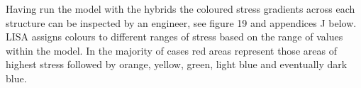 \noindent
Having run the model with the hybrids the coloured stress gradients across each structure can be inspected by an engineer, see figure 19 and appendices J below. LISA assigns colours to different ranges of stress based on the range of values within the model. In the majority of cases red areas represent those areas of highest stress followed by orange, yellow, green, light blue and eventually dark blue.  \\ 




